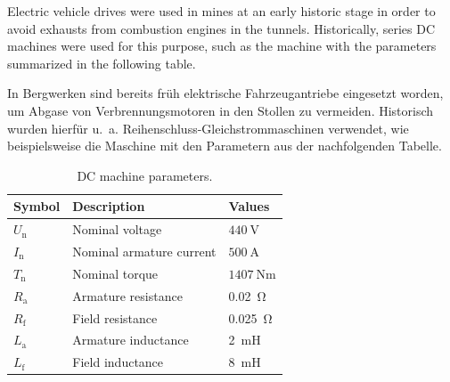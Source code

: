 
Electric vehicle drives were used in mines at an early historic stage in order to avoid exhausts  from combustion engines in the tunnels. Historically, series DC machines were used for this purpose, such as the machine with the parameters summarized in the following table.

\begin{germanblock}
    In Bergwerken sind bereits früh elektrische Fahrzeugantriebe eingesetzt worden, um Abgase von Verbrennungsmotoren in den Stollen zu vermeiden. Historisch wurden hierfür u.~a. Reihenschluss-Gleichstrommaschinen verwendet, wie beispielsweise die Maschine mit den Parametern aus der nachfolgenden Tabelle.
\end{germanblock}
\begin{table}[htb]
    \caption{DC machine parameters.}
    \centering
    \begin{tabular}{lll}\toprule
    Symbol  & Description       & Values \\
    \midrule
    $U_{\mathrm{n}}$    & Nominal voltage           & $\SI{440}{\volt}$ \\
    $I_{\mathrm{n}}$    & Nominal armature current           & $\SI{500}{\ampere}$ \\
    $T_{\mathrm{n}}$    & Nominal torque             & $\SI{1407}{\newton\meter}$ \\
    $R_\mathrm{a}$ & Armature resistance & \SI{0.02}{\ohm}\\
    $R_\mathrm{f}$ & Field resistance & \SI{0.025}{\ohm}\\
    $L_\mathrm{a}$ & Armature inductance & \SI{2}{\milli\henry}\\
    $L_\mathrm{f}$ & Field inductance & \SI{8}{\milli\henry}\\
    \bottomrule
    \end{tabular}
    \label{tab:characteristicsIM_task3}
\end{table}




